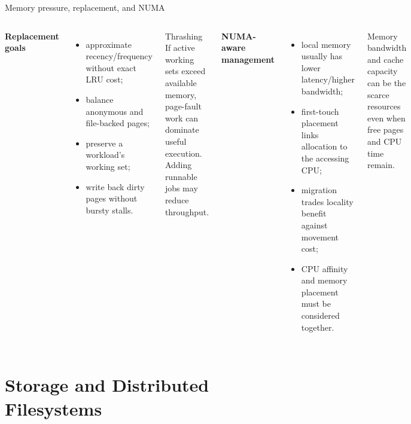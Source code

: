 \documentclass[aspectratio=169,11pt]{beamer}
\begin{document}
\begin{frame}{Memory pressure, replacement, and NUMA}
  \begin{columns}[T,onlytextwidth]
      \textbf{Replacement goals}
      \begin{itemize}
        \item approximate recency/frequency without exact LRU cost;
        \item balance anonymous and file-backed pages;
        \item preserve a workload's working set;
        \item write back dirty pages without bursty stalls.
      \end{itemize}
      \begin{alertblock}{Thrashing}
        If active working sets exceed available memory, page-fault work can dominate useful execution. Adding runnable jobs may reduce throughput.
      \end{alertblock}
      \textbf{NUMA-aware management}
      \begin{itemize}
        \item local memory usually has lower latency/higher bandwidth;
        \item first-touch placement links allocation to the accessing CPU;
        \item migration trades locality benefit against movement cost;
        \item CPU affinity and memory placement must be considered together.
      \end{itemize}
      \begin{tcolorbox}[title=Modern concern,colback=osorange!5,colframe=osorange!65]
        Memory bandwidth and cache capacity can be the scarce resources even when free pages and CPU time remain.
      \end{tcolorbox}
  \end{columns}
\end{frame}

\section{Storage and Distributed Filesystems}
\end{document}
